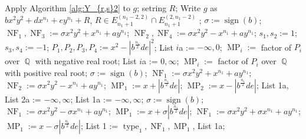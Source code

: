 \documentclass[noend]{amsproc}
\theoremstyle{definition}
\DeclareMathOperator{\MP}{MP}
\DeclareMathOperator{\type}{type}
\DeclareMathOperator{\sign}{sign}
\DeclareMathOperator{\NF}{NF}
\DeclareMathOperator{\Q}{\mathbb{Q}}
\begin{document}
\begin{algorithm}[ht]
\begin{algorithmic}[1]
\State Apply Algorithm \ref{alg:Y_{r,s}2} to $g$;
\State setring $R$;
\State Write $g$ as $bx^2y^2+dx^{n_1}+ey^{n_1}+R$, $R\in E^{(n_1-2,2)}_{n_1+1}\cap E^{(2,n_1-2)}_{n_1+1}$ ;
\State $\sigma := \sign(b)$;
\State $\NF_1,\NF_3 := \sigma x^2y^2+x^{n_1}+ay^{n_1}$;
\State $\NF_2,\NF_4 := \sigma x^2y^2-x^{n_1}+ay^{n_1}$;
\State $s_1, s_2 := 1$; 
\State $s_3, s_4 := -1$;
\State $P_1, P_2, P_3, P_4 := x^2-|b^{\frac{n_1}{2}}de|^2$;
{}
\State List $i$a := $-\infty, 0$;
\State $\MP_i := $ factor of $P_i$ over $\Q$ with negative real root;
\Else
\State List $i$a := $0, \infty$;
\State $\MP_i := $ factor of $P_i$ over $\Q$ with positive real root;
\EndIf
\EndFor
\Else
{}
\State $\sigma := \sign(b)$;
\State $\NF_1 := \sigma x^2y^2+x^{n_1}+ay^{n_1}$;
\State $\NF_2 := \sigma x^2y^2-x^{n_1}+ay^{n_1}$;
\State $\MP_1 := x+|b^{\frac{n_1}{2}}de|$;
\State $\MP_2 := x-|b^{\frac{n_1}{2}}de|$;
\State List 1a, List 2a := $-\infty, \infty$;
\Else
\State List 1a := $-\infty, \infty$;
\State $\sigma := \sign(b)$;
\State $\NF_1 := \sigma x^2y^2-\sigma x^{n_1}+ay^{n_1}$;
\State $\MP_1 := x+\sigma |b^{\frac{n_1}{2}}de|$;
\Else
\State $\NF_1 := \sigma x^2y^2+\sigma x^{n_1}+ay^{n_1}$;
\State $\MP_1 := x-\sigma |b^{\frac{n_1}{2}}de|$;
\EndIf
\EndIf
\EndIf
\EndIf
\State List 1 := $\type_1, \NF_1, \MP_1$, List 1a;
\end{algorithmic}
\end{algorithm}
\end{document}
